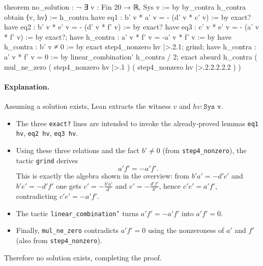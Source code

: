 \documentclass[11pt]{article}
\begin{document}
\begin{LeanCode}
theorem no_solution : ¬ ∃ v : Fin 20 → ℝ, Sys v := by
  by_contra h_contra
  obtain ⟨v, hv⟩ := h_contra
  have eq1 : b' v * a' v = - (d' v * c' v) := by
    exact?
  have eq2 : b' v * e' v = - (d' v * f' v) := by
    exact?
  have eq3 : c' v * e' v = - (a' v * f' v) := by
    exact?;
  have h_contra : a' v * f' v = -a' v * f' v := by
    have h_contra : b' v ≠ 0 := by
      exact step4_nonzero hv |>.2.1;
    grind;
  have h_contra : a' v * f' v = 0 := by
    linear_combination' h_contra / 2;
  exact absurd h_contra ( mul_ne_zero ( step4_nonzero hv |>.1 ) ( step4_nonzero hv |>.2.2.2.2.2 ) )
\end{LeanCode}

\paragraph{Explanation.}
Assuming a solution exists, Lean extracts the witness $v$ and $hv:\texttt{Sys v}$.

\begin{itemize}
\item The three \texttt{exact?} lines are intended to invoke the already-proved lemmas \texttt{eq1 hv}, \texttt{eq2 hv}, \texttt{eq3 hv}.
\item Using these three relations and the fact $b'\neq 0$ (from \texttt{step4\_nonzero}), the tactic \texttt{grind} derives
  \[
  a'f'=-a'f'.
  \]
  This is exactly the algebra shown in the overview: from $b'a'=-d'c'$ and $b'e'=-d'f'$ one gets $c'=-\frac{b'a'}{d'}$ and $e'=-\frac{d'f'}{b'}$, hence $c'e'=a'f'$, contradicting $c'e'=-a'f'$.
\item The tactic \texttt{linear\_combination'} turns $a'f'=-a'f'$ into $a'f'=0$.
\item Finally, \texttt{mul\_ne\_zero} contradicts $a'f'=0$ using the nonzeroness of $a'$ and $f'$ (also from \texttt{step4\_nonzero}).
\end{itemize}

Therefore no solution exists, completing the proof.
\end{document}
